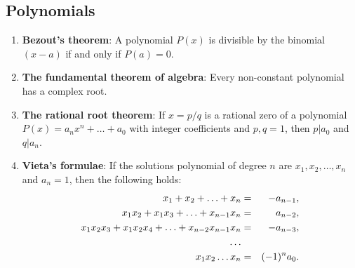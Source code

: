 \documentclass{article}
\begin{document}
  \subsection{Polynomials}
    \begin{enumerate}
      \item \textbf{Bezout's theorem}: A polynomial $P(x)$ is divisible by the binomial $(x-a)$ if and only if $P(a)=0$.

      \item \textbf{The fundamental theorem of algebra}: Every non-constant polynomial has a complex root.

      \item \textbf{The rational root theorem}: If $x = p/q$ is a rational zero
      of a polynomial $P(x) = a_nx^n +\hdots + a_0$ with integer coefficients and $p,q=1$,
      then $p | a_0$ and $q | a_n$.

      \item \textbf{Vieta's formulae}: If the solutions polynomial of degree $n$ are $x_1,x_2,\dots,x_n$ and  $a_n=1$, then the following holds:
      \begin{eqnarray*}
      x_1+x_2+\ldots+x_n &=& -a_{n-1},\\
      x_1x_2+x_1x_3+\ldots+x_{n-1}x_{n} &=& \hphantom{-} a_{n-2}, \\
      x_1x_2x_3+x_1x_2x_4+\ldots+x_{n-2}x_{n-1}x_n &=& -a_{n-3},\\
      \ldots \\
      x_1x_2\ldots x_n &=& (-1)^n a_0.
      \end{eqnarray*}
    \end{enumerate}
\end{document}
